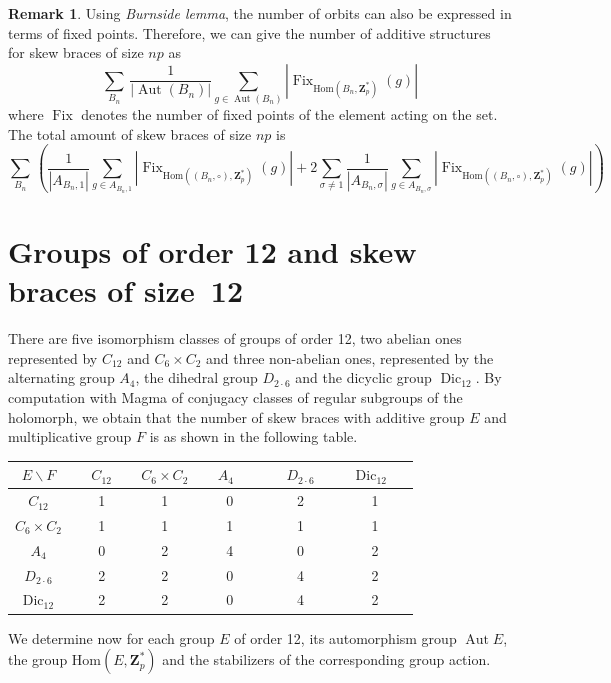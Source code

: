 \documentclass[12pt]{article}
\theoremstyle{definition}
\newtheorem{remark}[theorem]{Remark}
\newcommand{\Z}{\mathbf Z}
\newcommand{\Hom}{\mathrm{Hom}}
\newcommand{\Aut}{\operatorname{Aut}}
\newcommand{\Dic}{\operatorname{Dic}}
\begin{document}
\begin{remark}
 Using \textit{Burnside lemma}, the number of orbits can also be expressed in terms of fixed points. Therefore, we can give the number of additive structures for skew braces of size $np$ as 
 $$
		\sum_{B_n}\,   \dfrac{1}{|\Aut(B_n)|}\sum_{g \in \Aut(B_n)}|\operatorname {Fix}_{\Hom(B_n,\Z_p^*)}(g)|
		$$
        where $\operatorname{Fix}$ denotes the number of fixed points of the element acting on the set. 
The total amount of skew braces of size $np$ is
$$\sum_{B_n}\,
		\left(
		\dfrac{1}{|A_{B_n,1}|}\sum_{g \in A_{B_n,1}}|\operatorname {Fix}_{\Hom((B_n,\circ),\Z_p^*)}(g)|       
		+2\sum_{\sigma\ne 1}
		\dfrac{1}{|A_{B_n,\sigma}|}\sum_{ g \in A_{B_n,\sigma}}|\operatorname {Fix}_{\Hom((B_n,\circ),\Z_p^*)}(g)|  \right)  
		$$
\end{remark}

	
	
	
	\section{Groups of order 12 and skew braces of size~12}\label{twelve}
	
	There are five isomorphism classes of  groups of order 12, two abelian ones represented by $C_{12}$ and $C_6\times C_2$ and three non-abelian ones, represented by the alternating group $A_4$, the dihedral group $D_{2\cdot 6}$ and the dicyclic group $\Dic_{12}$. By computation with Magma \cite{BCP} of conjugacy classes of regular subgroups of the holomorph, we obtain that the number of skew braces with additive group $E$ and multiplicative group $F$ is as shown in the following table.
	\begin{center}
		\begin{tabular}{|c||c|c|c|c|c|}
			\hline
			$E \backslash F$ & \, \, $C_{12}$ \, \, & $C_6\times C_2$ & \, \, $A_4$ \, \, \, & \, \, $D_{2\cdot 6}$ \, \, & \,  $\Dic_{12}$ \, \, \\
			\hline
			\hline
			$C_{12}$ &1&1&0&2& 1\\
			\hline
			$C_6\times C_2$ &1&1&1&1& 1\\
			\hline
			$A_4$ &0&2&4&0& 2\\
			\hline
			$D_{2\cdot 6}$ &2&2&0&4& 2\\
			\hline
			$\Dic_{12}$ &2&2&0&4& 2\\
			\hline
		\end{tabular}
	\end{center}
	
	We determine now for each group $E$ of order 12, its automorphism group $\Aut E$, the group $\Hom(E,\Z_p^*)$ and the stabilizers of the corresponding group action.
	
\end{document}

